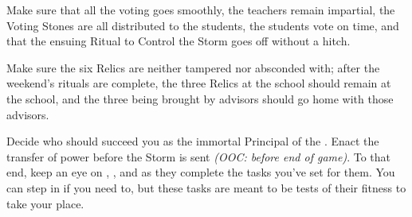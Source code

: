 \documentclass[char]{GL2020}
\begin{document}
\begin{itemz}
    \item Make sure that all the voting goes smoothly, the teachers remain impartial, the Voting Stones are all distributed to the students, the students vote on time, and that the ensuing Ritual to Control the Storm goes off without a hitch.
    \item Make sure the six Relics are neither tampered nor absconded with; after the weekend's rituals are complete, the three Relics at the school should remain at the school, and the three being brought by advisors should go home with those advisors.
    \item Decide who should succeed you as the immortal Principal of the \pSchool{}. Enact the transfer of power before the Storm is sent \emph{(OOC: before end of game)}. To that end, keep an eye on \cMusic{}, \cChupSecond{}, and \cBeetle{} as they complete the tasks you've set for them. You can step in if you need to, but these tasks are meant to be tests of their fitness to take your place.
\end{itemz}
\end{document}
